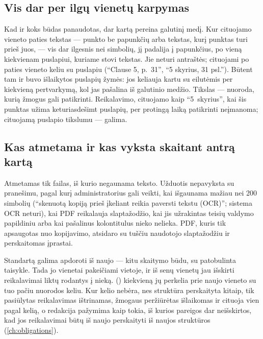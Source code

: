 \subsection{Vis dar per ilgų vienetų karpymas}\label{sec:corpus:cut}

Kad ir koks būdas panaudotas,  dar kartą pereina galutinį medį. Kur
cituojamo vieneto paties tekstas --- punkto be papunkčių arba tekstas, kurį punktas turi prieš
juos, --- vis dar ilgesnis nei  simbolių,  jį padalija
į papunkčius, po vieną kiekvienam puslapiui, kuriame stovi tekstas. Jie neturi antraštės;
cituojami po paties vieneto keliu su puslapiu (\enquote{Clause 5, p.~31}, \enquote{5 skyrius,
31 psl.}). Būtent tam ir buvo išlaikytos puslapių žymės: jos keliauja kartu su eilutėmis per
kiekvieną pertvarkymą, kol  jas pašalina iš galutinio medžio. Tikslas ---
nuoroda, kurią žmogus gali patikrinti. Reikalavimo, cituojamo kaip \enquote{5~skyrius}, kai
šis punktas užima keturiasdešimt puslapių, per protingą laiką patikrinti neįmanoma; cituojamą
puslapio tikslumu --- galima.

\subsection{Kas atmetama ir kas vyksta skaitant antrą kartą}\label{sec:corpus:refused}

Atmetamas tik failas, iš kurio negaunama teksto. Užduotis nepavyksta su pranešimu, pagal kurį
administratorius gali veikti, kai išgaunama mažiau nei 200 simbolių (\enquote{skenuotą kopiją
prieš įkeliant reikia paversti tekstu (OCR)}; sistema OCR neturi), kai PDF reikalauja
slaptažodžio, kai jis užrakintas teisių valdymo papildiniu arba kai pašalinus kolontitulus
nieko nelieka. PDF, kuris tik apsaugotas nuo kopijavimo, atsidaro su tuščiu naudotojo
slaptažodžiu ir perskaitomas įprastai.

Standartą galima apdoroti iš naujo --- kitu skaitymo būdu, su patobulinta taisykle. Tada jo
vienetai pakeičiami vietoje, ir iš senų vienetų jau išskirti reikalavimai liktų rodantys į
nieką.  () kiekvieną jų perkelia prie naujo
vieneto su tuo pačiu nuorodos keliu. Kur kelio nebėra, nes struktūra perskaityta kitaip, tik
pasiūlytas reikalavimas ištrinamas, žmogaus peržiūrėtas išlaikomas ir cituoja vien pagal kelią,
o redakcija pažymima kaip tokia, iš kurios pareigos dar neišskirtos, kad jos reikalavimai būtų iš naujo perskaityti iš
naujos struktūros (\cref{ch:obligations}).

